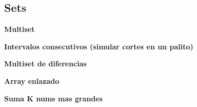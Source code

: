 \subsection{Sets}
    \textbf{Multiset}
    

    \textbf{Intervalos consecutivos (simular cortes en un palito)}
    

    \textbf{Multiset de diferencias}
    

    \textbf{Array enlazado}
    

    \textbf{Suma K nums mas grandes}
    
